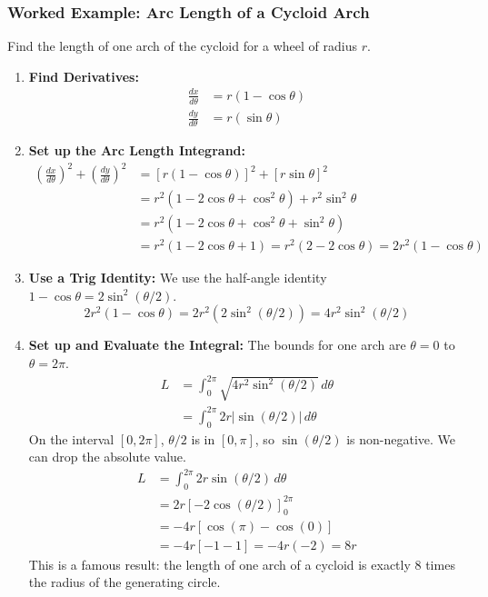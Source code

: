 \documentclass{article}
\begin{document}
\subsubsection{Worked Example: Arc Length of a Cycloid Arch}
Find the length of one arch of the cycloid for a wheel of radius $r$.
\begin{enumerate}
    \item \textbf{Find Derivatives:}
    \begin{align*}
    \frac{dx}{d\theta} &= r(1 - \cos\theta) \\
    \frac{dy}{d\theta} &= r(\sin\theta)
    \end{align*}
    \item \textbf{Set up the Arc Length Integrand:}
    \begin{align*}
    \left(\frac{dx}{d\theta}\right)^2 + \left(\frac{dy}{d\theta}\right)^2 &= [r(1-\cos\theta)]^2 + [r\sin\theta]^2 \\
    &= r^2(1 - 2\cos\theta + \cos^2\theta) + r^2\sin^2\theta \\
    &= r^2(1 - 2\cos\theta + \cos^2\theta + \sin^2\theta) \\
    &= r^2(1 - 2\cos\theta + 1) = r^2(2 - 2\cos\theta) = 2r^2(1-\cos\theta)
    \end{align*}
    \item \textbf{Use a Trig Identity:} We use the half-angle identity $1 - \cos\theta = 2\sin^2(\theta/2)$.
    \[ 2r^2(1-\cos\theta) = 2r^2(2\sin^2(\theta/2)) = 4r^2\sin^2(\theta/2) \]
    \item \textbf{Set up and Evaluate the Integral:} The bounds for one arch are $\theta = 0$ to $\theta = 2\pi$.
    \begin{align*}
    L &= \int_0^{2\pi} \sqrt{4r^2\sin^2(\theta/2)} \, d\theta \\
      &= \int_0^{2\pi} 2r |\sin(\theta/2)| \, d\theta
    \end{align*}
    On the interval $[0, 2\pi]$, $\theta/2$ is in $[0, \pi]$, so $\sin(\theta/2)$ is non-negative. We can drop the absolute value.
    \begin{align*}
    L &= \int_0^{2\pi} 2r \sin(\theta/2) \, d\theta \\
      &= 2r \left[ -2\cos(\theta/2) \right]_0^{2\pi} \\
      &= -4r [\cos(\pi) - \cos(0)] \\
      &= -4r [-1 - 1] = -4r(-2) = 8r
    \end{align*}
    This is a famous result: the length of one arch of a cycloid is exactly 8 times the radius of the generating circle.
\end{enumerate}
\end{document}
